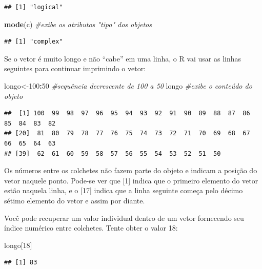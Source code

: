 \documentclass[
]{book}
\newenvironment{Shaded}{\begin{snugshade}}{\end{snugshade}}
\newcommand{\CommentTok}[1]{\textcolor[rgb]{0.56,0.35,0.01}{\textit{#1}}}
\newcommand{\DecValTok}[1]{\textcolor[rgb]{0.00,0.00,0.81}{#1}}
\newcommand{\KeywordTok}[1]{\textcolor[rgb]{0.13,0.29,0.53}{\textbf{#1}}}
\newcommand{\NormalTok}[1]{#1}
\newcommand{\OperatorTok}[1]{\textcolor[rgb]{0.81,0.36,0.00}{\textbf{#1}}}
\begin{document}
\begin{verbatim}
## [1] "logical"
\end{verbatim}

\begin{Shaded}
\begin{Highlighting}[]
\KeywordTok{mode}\NormalTok{(c) }\CommentTok{#exibe os atributos "tipo" dos objetos }
\end{Highlighting}
\end{Shaded}

\begin{verbatim}
## [1] "complex"
\end{verbatim}

Se o vetor é muito longo e não ``cabe'' em uma linha, o R vai usar as linhas seguintes para continuar imprimindo o vetor:

\begin{Shaded}
\begin{Highlighting}[]
\NormalTok{longo<-}\DecValTok{100}\OperatorTok{:}\DecValTok{50} \CommentTok{#sequência decrescente de 100 a 50}
\NormalTok{longo }\CommentTok{#exibe o conteúdo do objeto }
\end{Highlighting}
\end{Shaded}

\begin{verbatim}
##  [1] 100  99  98  97  96  95  94  93  92  91  90  89  88  87  86  85  84  83  82
## [20]  81  80  79  78  77  76  75  74  73  72  71  70  69  68  67  66  65  64  63
## [39]  62  61  60  59  58  57  56  55  54  53  52  51  50
\end{verbatim}

Os números entre os colchetes não fazem parte do objeto e indicam a posição do vetor naquele ponto. Pode-se ver que {[}1{]} indica que o primeiro elemento do vetor estão naquela linha, e o {[}17{]} indica que a linha seguinte começa pelo décimo sétimo elemento do vetor e assim por diante.

Você pode recuperar um valor individual dentro de um vetor fornecendo seu índice numérico entre colchetes. Tente obter o valor 18:

\begin{Shaded}
\begin{Highlighting}[]
\NormalTok{longo[}\DecValTok{18}\NormalTok{]}
\end{Highlighting}
\end{Shaded}

\begin{verbatim}
## [1] 83
\end{verbatim}
\end{document}
